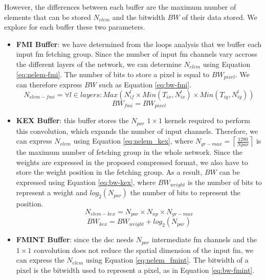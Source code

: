 However, the differences between each buffer are the maximum number of elements that can be stored $N_{elem}$ and the bitwidth $BW$ of their data stored. We explore for each buffer these two parameters.
\begin{itemize}
    \item \textbf{FMI Buffer}: we have determined from the loops analysis that we buffer each input \acrshort{fm} fetching group. Since the number of input \acrshort{fm} channels vary accross the different layers of the network, we can determine $N_{elem}$ using Equation \eqref{eq:nelem-fmi}. The number of bits to store a pixel is equal to $BW_{pixel}$. We can therefore express $BW$ such as Equation \eqref{eq:bw-fmi}.
    \begin{equation}
        N_{elem-fmi} = \forall l \in layers: Max\left( N_{if}^l \times Min\left(T_{ix}, N_{ix}^l\right) \times Min\left(T_{iy}, N_{iy}^l\right) \right)
        \label{eq:nelem-fmi}
    \end{equation}
    \begin{equation}
        BW_{fmi} = BW_{pixel}
        \label{eq:bw-fmi}
    \end{equation}
    \item \textbf{KEX Buffer}: this buffer stores the $N_{par}$ $1 \times 1$ kernels required to perform this convolution, which expands the number of input channels. Therefore, we can express $N_{elem}$ using Equation \eqref{eq:nelem_kex}, where $N_{gr-max} = \left\lceil \frac{1280}{Npar} \right\rceil$ is the maximum number of fetching group in the whole network. Since the weights are expressed in the proposed compressed format, we also have to store the weight position in the fetching group.
    As a result, $BW$ can be expressed using Equation \eqref{eq:bw-kex}, where $BW_{weight}$ is the number of bits to represent a weight and $log_2(N_{par})$ the number of bits to represent the position.
    \begin{equation}
        N_{elem-kex} = N_{par} \times N_{np} \times N_{gr-max}
        \label{eq:nelem_kex}
    \end{equation}
    \begin{equation}
        BW_{kex} = BW_{weight} + log_2(N_{par})
        \label{eq:bw-kex}
    \end{equation}
    \item \textbf{FMINT Buffer}: since the \acrshort{dsc} needs $N_{par}$ intermediate \acrshort{fm} channels and the $1 \times 1$ convolution does not reduce the spatial dimension of the input \acrshort{fm}, we can express the $N_{elem}$ using Equation \eqref{eq:nelem_fmint}. The bitwidth of a pixel is the bitwidth used to represent a pixel, as in Equation \eqref{eq:bw-fmint}.

\end{itemize}
